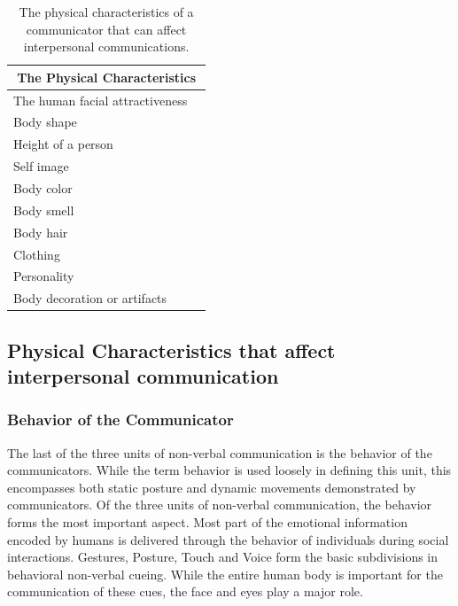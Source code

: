 \documentclass[oneside,11pt]{memoir}
\begin{document}
\begin{table}[hpdf]
\begin{center}
\caption{The physical characteristics of a communicator that can affect interpersonal communications.}
\label{Tab:Table2}
\begin{tabular}{||l||l||}
\hline
\hline
\multicolumn{2}{||c||}{The Physical Characteristics} \\
\hline
\hline
The human facial attractiveness	& \cite{berry_attractive_1991} \cite{zebrowitz_reading_1997} \cite{berry_perceiving_1986}\\
\hline
Body shape & \cite{cortes_physique_1965} \cite{tucker_physical_1984}\\
\hline
Height of a person & \cite{cameron_courtship_1977}\\
\hline
Self image & \cite{ogden_prevalence_2002}\\
\hline
Body color & \cite{griffin_black_1996}\\
\hline
Body smell & \cite{porter_olfaction_1998} \cite{lord_identification_1989} \cite{russell_human_1976}\\
\hline
Body hair & \cite{barber_mustache_2001}\\
\hline
Clothing & \cite{johnson_clothing_1977} \cite{hensley_effects_1981}\\
\hline
Personality	& \cite{joseph_uniforms_1986} \cite{rosenfeld_clothing_1977}\\
\hline
Body decoration or artifacts & \cite{sanders_customizing_2008}\\
\hline
\hline
\end{tabular}
\end{center}
\end{table}

\subsection{Physical Characteristics that affect interpersonal communication}
\subsubsection{Behavior of the Communicator}
The last of the three units of non-verbal communication is the behavior of the communicators. While the term behavior is used loosely in defining this unit, this encompasses both static posture and dynamic movements demonstrated by communicators. Of the three units of non-verbal communication, the behavior forms the most important aspect. Most part of the emotional information encoded by humans is delivered through the behavior of individuals during social interactions. Gestures, Posture, Touch and Voice form the basic subdivisions in behavioral non-verbal cueing. While the entire human body is important for the communication of these cues, the face and eyes play a major role.
\end{document}
